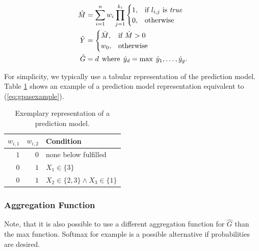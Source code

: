 \documentclass[dvipsnames,format=sigconf,anonymous=false,review=false]{acmart}
\begin{document}
\begin{equation*}
  \begin{split}
    \hat{M} &= \sum_{i=1}^{n} w_i \prod_{j=1}^{k_{i}} \begin{cases} 1, & \textrm{if
      } l_{i,j} \textrm{ is }\textit{true}\\ 0, & \textrm{otherwise} \end{cases} \\
  \hat{Y} &= \begin{cases} \hat{M}, & \textrm{if
     } \hat{M} > 0 \\ w_0, & \textrm{otherwise} \end{cases}  \\ 
  \hat{G} &= d \hspace*{1ex} \text{where} \hspace*{1ex} \hat{y}_d = \text{max} \hspace*{1ex} {\hat{y}_1,\ldots,\hat{y}_g}.
  \end{split}
\end{equation*}

For simplicity, we typically use a tabular representation of the prediction model. Table \ref{tab:example} shows an example of a prediction model representation equivalent to (\ref{eq:gpasexample}).  

\begin{table}
  \centering
  \caption{Exemplary representation of a prediction model.}
  \label{tab:example}
  \begin{tabular}{rrl}
    \toprule
  $w_{i,1}$ & $w_{i,2}$ & Condition \\ 
  \midrule
  $1$             & $0$                   & none below fulfilled                \\ 
  $0$             & $1$                   & $X_1\in\{3\}$                             \\
  $0$             & $1$                   & $X_2\in\{2,3\}\wedge X_3\in\{1\}$              \\
  \bottomrule
  \end{tabular}
  \end{table}

  

\subsubsection{Aggregation Function}
  

Note, that it is also possible to use a different aggregation function for $\hat{G}$ than the max function. Softmax for example is a possible alternative if probabilities are desired. 
\end{document}
